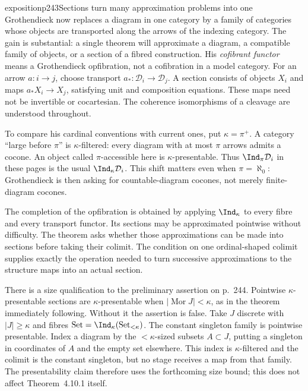 \begin{dcomment}{exposition}{p243}{Sections turn many approximation problems into one}
Grothendieck now replaces a diagram in one category by a family of categories whose objects are transported along the arrows of the indexing category. The gain is substantial: a single theorem will approximate a diagram, a compatible family of objects, or a section of a fibred construction. His \emph{cofibrant functor} means a Grothendieck opfibration, not a cofibration in a model category. For an arrow $a:i\to j$, choose transport $a_*:\mathcal D_i\to\mathcal D_j$. A section consists of objects $X_i$ and maps $a_*X_i\to X_j$, satisfying unit and composition equations. These maps need not be invertible or cocartesian. The coherence isomorphisms of a cleavage are understood throughout.

To compare his cardinal conventions with current ones, put $\kappa=\pi^+$. A category ``large before $\pi$'' is $\kappa$-filtered: every diagram with at most $\pi$ arrows admits a cocone. An object called $\pi$-accessible here is $\kappa$-presentable. Thus $\Ind_\pi\mathcal D_i$ in these pages is the usual $\Ind_\kappa\mathcal D_i$. This shift matters even when $\pi=\aleph_0$: Grothendieck is then asking for countable-diagram cocones, not merely finite-diagram cocones.

The completion of the opfibration is obtained by applying $\Ind_\kappa$ to every fibre and every transport functor. Its sections may be approximated pointwise without difficulty. The theorem asks whether those approximations can be made into sections before taking their colimit. The condition on one ordinal-shaped colimit supplies exactly the operation needed to turn successive approximations to the structure maps into an actual section.

There is a size qualification to the preliminary assertion on p.~244. Pointwise $\kappa$-presentable sections are $\kappa$-presentable when $|\operatorname{Mor}J|<\kappa$, as in the theorem immediately following. Without it the assertion is false. Take $J$ discrete with $|J|\geq\kappa$ and fibres $\mathrm{Set}=\Ind_\kappa(\mathrm{Set}_{<\kappa})$. The constant singleton family is pointwise presentable. Index a diagram by the $<\kappa$-sized subsets $A\subset J$, putting a singleton in coordinates of $A$ and the empty set elsewhere. This index is $\kappa$-filtered and the colimit is the constant singleton, but no stage receives a map from that family. The presentability claim therefore uses the forthcoming size bound; this does not affect Theorem~4.10.1 itself.
\end{dcomment}

